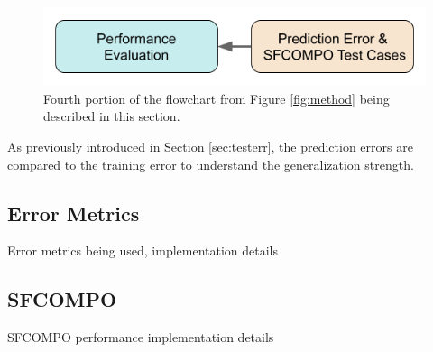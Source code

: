
\begin{figure}[H]
  \centering
  \includegraphics[width=0.7\linewidth]{./chapters/method/methodology4.png}
  \caption{Fourth portion of the flowchart from Figure \ref{fig:method} being 
           described in this section.}
\end{figure}

As previously introduced in Section \ref{sec:testerr}, the prediction errors
are compared to the training error to understand the generalization strength. 

\subsection{Error Metrics}
Error metrics being used, implementation details

\subsection{SFCOMPO}
SFCOMPO performance implementation details

